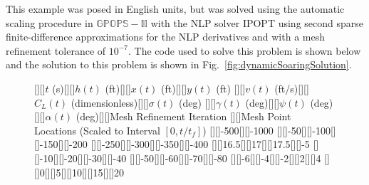 \documentclass[10pt]{article}
\newenvironment{shadedframe}{%
  \def\FrameCommand{\fcolorbox{black}{shadecolor}}%
  \MakeFramed {\FrameRestore}}
{\endMakeFramed}
\begin{document}
This example was posed in English units, but was solved using the 
automatic scaling procedure in $\mathbb{GPOPS-II}$ with the NLP solver
IPOPT using second sparse finite-difference approximations for the NLP
derivatives and with a mesh refinement tolerance of $10^{-7}$.  The
code used to solve this problem is shown below and the solution to
this problem is shown in Fig.~\ref{fig:dynamicSoaringSolution}. 
\begin{shadedframe}



\end{shadedframe} 

\begin{figure}[h]
\psfragscanon
{}[][]{\footnotesize$t$ (s)}[][]{\footnotesize$h(t)$ (ft)}[][]{\footnotesize$x(t)$ (ft)}[][]{\footnotesize$y(t)$ (ft)}
[][]{\footnotesize$v(t)$ (ft/s)}[][]{\footnotesize$C_L(t)$ (dimensionless)}[][]{\footnotesize$\sigma(t)$ (deg)}
[][]{\footnotesize$\gamma(t)$ (deg)}[][]{\footnotesize$\psi(t)$ (deg)}
[][]{\footnotesize$\alpha(t)$ (deg)}[][]{\footnotesize Mesh Refinement Iteration}
[][]{\footnotesize Mesh Point Locations (Scaled to Interval $[0,t/t_f]$)} 
[][]{\footnotesize -500}[][]{\footnotesize -1000}
[][]{\footnotesize -50}[][]{\footnotesize -100}[][]{\footnotesize -150}[][]{\footnotesize -200}
[][]{\footnotesize -250}[][]{\footnotesize -300}[][]{\footnotesize -350}[][]{\footnotesize -400}
[][]{\footnotesize 16.5}[][]{\footnotesize 17}[][]{\footnotesize 17.5}[][]{\footnotesize -5}
[][]{\footnotesize -10}[][]{\footnotesize -20}[][]{\footnotesize -30}[][]{\footnotesize -40}
[][]{\footnotesize -50}[][]{\footnotesize -60}[][]{\footnotesize -70}[][]{\footnotesize -80}
[][]{\footnotesize -6}[][]{\footnotesize -4}[][]{\footnotesize -2}[][]{\footnotesize 2}[][]{\footnotesize 4}
[][]{\footnotesize 0}[][]{\footnotesize 5}[][]{\footnotesize 10}[][]{\footnotesize 15}[][]{\footnotesize 20}

\end{figure}
\end{document}
